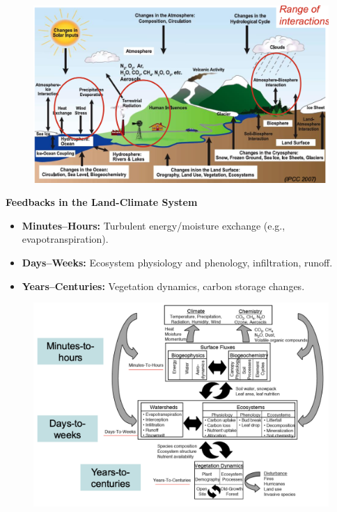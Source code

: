 \documentclass[fontsize=8pt, a4paper, landscape, fleqn]{scrartcl}
\renewcommand{\subsection}[1]{%
    \noindent\colorbox{subsectioncolor}{%
        \parbox{\dimexpr\columnwidth-2\fboxsep}{\color{white}\textbf{#1}}}%
    \vspace{0.5mm}%
}
\begin{document}
\begin{multicols*}{3}[\raggedcolumns]
\begin{figure}[H]
    \centering
    \includegraphics[width=\linewidth]{CS/img/Terrestrial Biomes, Land-climate processes.png}
\end{figure}
\subsection{Feedbacks in the Land-Climate System}
\begin{itemize}
    \item \textbf{Minutes–Hours:} Turbulent energy/moisture exchange (e.g., evapotranspiration).
    \item \textbf{Days–Weeks:} Ecosystem physiology and phenology, infiltration, runoff.
    \item \textbf{Years–Centuries:} Vegetation dynamics, carbon storage changes.
\end{itemize}
\begin{figure}[H]
    \centering
    \includegraphics[width=\linewidth]{CS/img/Land_Climate_across_timescales.png}
\end{figure}


\end{multicols*}
\end{document}
